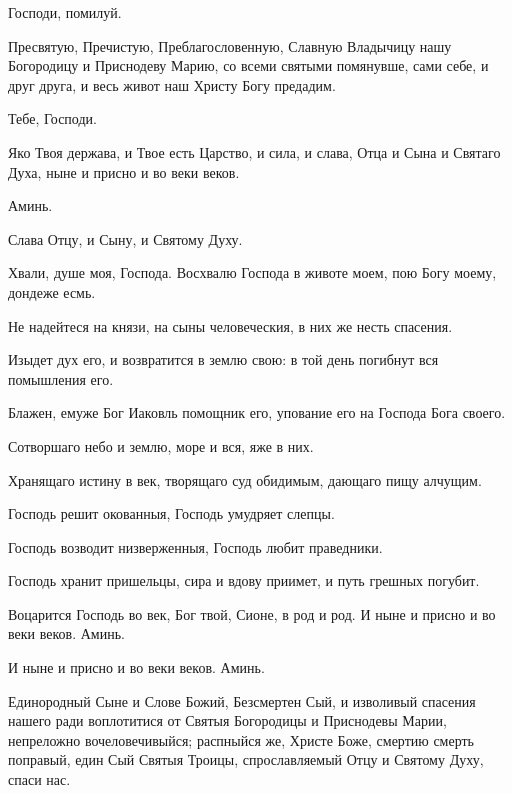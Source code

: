 \begin{mymulticols}
 Господи, помилуй. 

 Пресвятую, Пречистую, Преблагословенную, Славную Владычицу нашу Богородицу и Приснодеву Марию, со всеми святыми помянувше, сами себе, и друг друга, и весь живот наш Христу Богу предадим. 

 Тебе, Господи. 

 Яко Твоя держава, и Твое есть Царство, и сила, и слава, Отца и Сына и Святаго Духа, ныне и присно и во веки веков. 

 Аминь. 



 Слава Отцу, и Сыну, и Святому Духу. 

 Хвали, душе моя, Господа. Восхвалю Господа в животе моем, пою Богу моему, дондеже есмь. 

 Не надейтеся на князи, на сыны человеческия, в них же несть спасения. 

 Изыдет дух его, и возвратится в землю свою: в той день погибнут вся помышления его. 

 Блажен, емуже Бог Иаковль помощник его, упование его на Господа Бога своего. 

 Сотворшаго небо и землю, море и вся, яже в них. 

 Хранящаго истину в век, творящаго суд обидимым, дающаго пищу алчущим. 

 Господь решит окованныя, Господь умудряет слепцы. 

 Господь возводит низверженныя, Господь любит праведники. 

 Господь хранит пришельцы, сира и вдову приимет, и путь грешных погубит. 

 Воцарится Господь во век, Бог твой, Сионе, в род и род. И ныне и присно и во веки веков. Аминь. 

 И ныне и присно и во веки веков. Аминь. 


 Единородный Сыне и Слове Божий, Безсмертен Сый, и изволивый спасения нашего ради воплотитися от Святыя Богородицы и Приснодевы Марии, непреложно вочеловечивыйся; распныйся же, Христе Боже, смертию смерть поправый, един Сый Святыя Троицы, спрославляемый Отцу и Святому Духу, спаси нас. 


\end{mymulticols}
